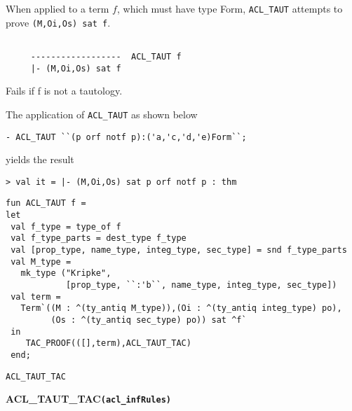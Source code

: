 \DESCRIBE When applied to a term $f$, which must have type Form,
\texttt{ACL\_TAUT} attempts to prove \texttt{(M,Oi,Os) sat f}.
\begin{verbatim}

     ------------------  ACL_TAUT f
     |- (M,Oi,Os) sat f

\end{verbatim}
\FAILURE
Fails if f is not a tautology.

\EXAMPLE
The application of \texttt{ACL\_TAUT} as shown below
\begin{holboxed}
\begin{verbatim}
- ACL_TAUT ``(p orf notf p):('a,'c,'d,'e)Form``;
\end{verbatim}
\end{holboxed}
yields the result
\begin{holboxed}
\begin{verbatim}
> val it = |- (M,Oi,Os) sat p orf notf p : thm
\end{verbatim}
\end{holboxed}

\IMPLEMENTATION
\begin{holboxed}
\begin{verbatim}
fun ACL_TAUT f =
let
 val f_type = type_of f
 val f_type_parts = dest_type f_type
 val [prop_type, name_type, integ_type, sec_type] = snd f_type_parts
 val M_type = 
   mk_type ("Kripke",
            [prop_type, ``:'b``, name_type, integ_type, sec_type])
 val term = 
   Term`((M : ^(ty_antiq M_type)),(Oi : ^(ty_antiq integ_type) po),
         (Os : ^(ty_antiq sec_type) po)) sat ^f`
 in
    TAC_PROOF(([],term),ACL_TAUT_TAC)
 end;
\end{verbatim}
\end{holboxed}

\SEEALSO
\texttt{ACL\_TAUT\_TAC}
\ENDDOC

\begin{holboxed}
  \begin{Large}
    \textbf{\Large{ACL\_TAUT\_TAC}}\hfill{}\texttt{\textbf{(acl\_infRules)}}
  \end{Large}
\end{holboxed}

